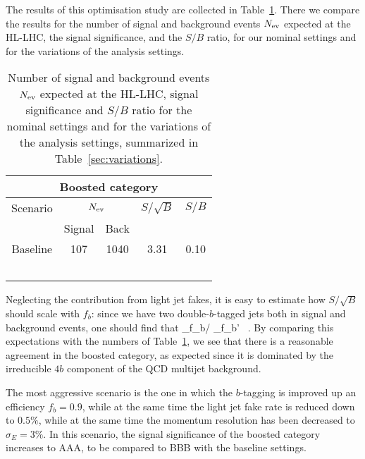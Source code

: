The results of this optimisation study are collected in
Table~\ref{table:cutflowMVAoptimisation}.
%
There we compare the results for the number of signal
and background events $N_{\rm ev}$ expected at the
HL-LHC, the signal significance, and the $S/B$ ratio,
for our nominal settings and for the variations
of the analysis settings.

\begin{table}[t]
  \centering
  \begin{tabular}{c||c|c|c|c}
    \hline
    \multicolumn{5}{c}{Boosted category}\\
    \hline
    \hline
 Scenario &    \multicolumn{2}{c|}{$N_{\rm ev}$} &  $S/\sqrt{B}$  & $S/B$ \\
       &   Signal & Back   &     &    \\
 \hline
 \hline
   Baseline   & 107 & 1040 & 3.31  & 0.10\\
   \hline
   &  &   &   &   \\
   &  &   &   &   \\
   &  &   &   &   \\
   &  &   &   &   \\
         &  &   &   &   \\
   \hline
  \end{tabular}
  \caption{\small
Number of signal
and background events $N_{\rm ev}$ expected at the
HL-LHC, signal significance and $S/B$ ratio
for the nominal settings and for the variations
of the analysis settings, summarized
in  Table~\ref{sec:variations}.
 \label{table:cutflowMVAoptimisation}
  }
\end{table}

Neglecting the
contribution from light jet fakes,
it is easy to estimate how $S/\sqrt{B}$ should
scale with $f_b$: since we have two double-$b$-tagged jets
both in signal and background events, one should find that
\be
\lp {} \rp _{f_b}\Bigg/
\lp {} \rp_{f_b'}
\simeq {} \, .
\ee
By comparing this expectations with the numbers of
Table~\ref{table:cutflowMVAoptimisation}, we see that there
is a reasonable agreement in the boosted category,
as expected since it is dominated by the irreducible
$4b$ component of the QCD multijet background.

The most aggressive scenario is the one in which the $b$-tagging
is improved up an efficiency $f_b=0.9$, while at the same
time the light jet fake rate is reduced down to $0.5\%$, while
at the same time the momentum resolution has been decreased
to $\sigma_E=3\%$.
%
In this scenario, the signal significance of the boosted category
increases to AAA, to be compared to BBB with the baseline settings.






